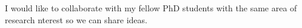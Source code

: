I would like to collaborate with my fellow PhD students with the same area of research nterest so we can share ideas.
